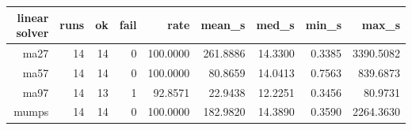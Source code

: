 {\footnotesize
\begin{longtable}{|r|r|r|r|r|r|r|r|r|}
  \hline
  \textbf{linear solver} & \textbf{runs} & \textbf{ok} & \textbf{fail} & \textbf{rate} & \textbf{mean\_s} & \textbf{med\_s} & \textbf{min\_s} & \textbf{max\_s} \\
  \hline
  ma27 & 14 & 14 & 0 & 100.0000 & 261.8886 & 14.3300 & 0.3385 & 3390.5082 \\
  ma57 & 14 & 14 & 0 & 100.0000 & 80.8659 & 14.0413 & 0.7563 & 839.6873 \\
  ma97 & 14 & 13 & 1 & 92.8571 & 22.9438 & 12.2251 & 0.3456 & 80.9731 \\
  mumps & 14 & 14 & 0 & 100.0000 & 182.9820 & 14.3890 & 0.3590 & 2264.3630 \\
  \hline
\end{longtable}
}
